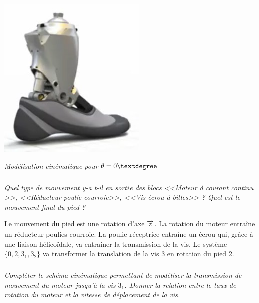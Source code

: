 \documentclass[10pt,fleqn]{article} %
\begin{document}
\begin{minipage}[c]{.43\linewidth}
\begin{center}
\includegraphics[width=\textwidth]{images/prot_01}

\textit{Modélisation cinématique pour $\theta=0\textdegree$}
\end{center}
\end{minipage}
\fi


\subparagraph{}
\textit{Quel type de mouvement y-a t-il en sortie des blocs <<Moteur à courant continu >>, <<Réducteur poulie-courroie>>, <<Vis-écrou à billes>> ? Quel est le mouvement final du pied ?} 

\ifprof
\begin{corrige}
Le mouvement du pied est une rotation d'axe $\overrightarrow{z_{}}$. La rotation du moteur entraîne un réducteur poulies-courroie. La poulie réceptrice entraîne un écrou qui, grâce à une liaison hélicoïdale, va entrainer la transmission de la vis. Le système $\{0, 2, 3_1, 3_2\}$ va transformer la translation de la vis 3 en rotation du pied 2. 
\end{corrige}
\else
\fi

\subparagraph{}
\textit{Compléter le schéma cinématique permettant de modéliser la transmission de mouvement du moteur jusqu'à la vis $3_1$. Donner la relation entre le taux de rotation du moteur et la vitesse de déplacement de la vis.}
\end{document}
